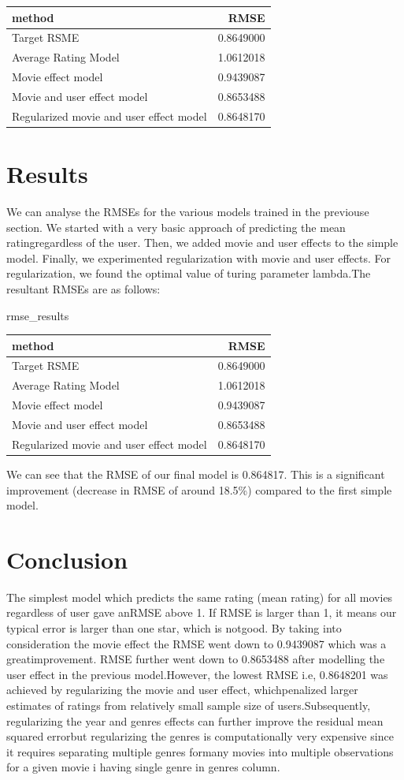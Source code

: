 \documentclass[]{article}
\newenvironment{Shaded}{\begin{snugshade}}{\end{snugshade}}
\newcommand{\NormalTok}[1]{#1}
\begin{document}
\begin{longtable}[]{@{}lr@{}}
\toprule
method & RMSE\tabularnewline
\midrule
\endhead
Target RSME & 0.8649000\tabularnewline
Average Rating Model & 1.0612018\tabularnewline
Movie effect model & 0.9439087\tabularnewline
Movie and user effect model & 0.8653488\tabularnewline
Regularized movie and user effect model & 0.8648170\tabularnewline
\bottomrule
\end{longtable}

\section{Results}
\label{sec:results}

We can analyse the RMSEs for the various models trained in the previouse
section. We started with a very basic approach of predicting the mean
ratingregardless of the user. Then, we added movie and user effects to
the simple model. Finally, we experimented regularization with movie and
user effects. For regularization, we found the optimal value of turing
parameter lambda.The resultant RMSEs are as follows:

\begin{Shaded}
\begin{Highlighting}[]
\NormalTok{rmse_results}
\end{Highlighting}
\end{Shaded}

\begin{longtable}[]{@{}lr@{}}
\toprule
method & RMSE\tabularnewline
\midrule
\endhead
Target RSME & 0.8649000\tabularnewline
Average Rating Model & 1.0612018\tabularnewline
Movie effect model & 0.9439087\tabularnewline
Movie and user effect model & 0.8653488\tabularnewline
Regularized movie and user effect model & 0.8648170\tabularnewline
\bottomrule
\end{longtable}

We can see that the RMSE of our final model is 0.864817. This is a
significant improvement (decrease in RMSE of around 18.5\%) compared to
the first simple model.

\section{Conclusion}
\label{sec:conclusion}

The simplest model which predicts the same rating (mean rating) for all
movies regardless of user gave anRMSE above 1. If RMSE is larger than 1,
it means our typical error is larger than one star, which is notgood. By
taking into consideration the movie effect the RMSE went down to
0.9439087 which was a greatimprovement. RMSE further went down to
0.8653488 after modelling the user effect in the previous model.However,
the lowest RMSE i.e, 0.8648201 was achieved by regularizing the movie
and user effect, whichpenalized larger estimates of ratings from
relatively small sample size of users.Subsequently, regularizing the
year and genres effects can further improve the residual mean squared
errorbut regularizing the genres is computationally very expensive since
it requires separating multiple genres formany movies into multiple
observations for a given movie i having single genre in genres column.
\end{document}
